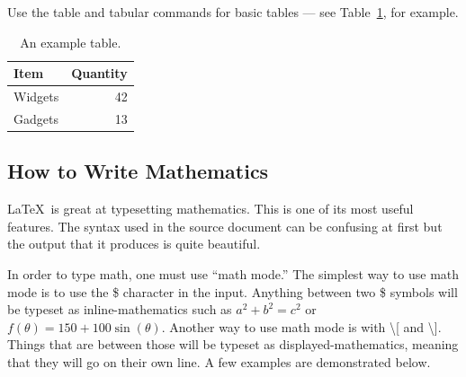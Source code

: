 \documentclass{article}
\begin{document}
Use the table and tabular commands for basic tables --- see Table~\ref{tab:widgets}, for example.

\begin{table}[ht]
\centering
\begin{tabular}{l|r}
Item & Quantity \\ %
\hline %
Widgets & 42 \\ %
Gadgets & 13 %
\end{tabular}
\caption{An example table.}
\label{tab:widgets}
\end{table}

\subsection{How to Write Mathematics}

\LaTeX\ is great at typesetting mathematics. This is one of its most useful features.  The syntax used in the source document can be confusing at first but the output that it produces is quite beautiful.

In order to type math, one must use ``math mode.''  The simplest way to use math mode is to use the \$ character in the input.  Anything between two \$ symbols will be typeset as inline-mathematics such as $a^2 + b^2 = c^2$ or $f(\theta) = 150 + 100 \sin(\theta)$.  Another way to use math mode is with \textbackslash[ and \textbackslash].  Things that are between those will be typeset as displayed-mathematics, meaning that they will go on their own line.  A few examples are demonstrated below.
\end{document}
